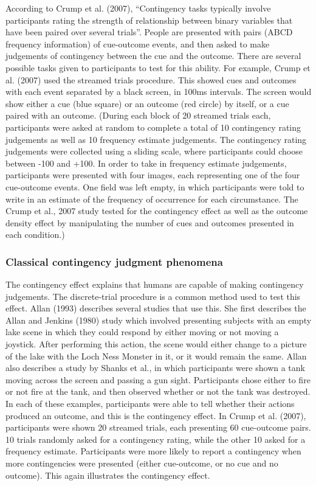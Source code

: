 \documentclass[
  english,
  man,floatsintext]{apa6}
\begin{document}
According to Crump et al. (2007), \enquote{Contingency tasks typically involve participants rating the strength of relationship between binary variables that have been paired over several trials}. People are presented with pairs (ABCD frequency information) of cue-outcome events, and then asked to make judgements of contingency between the cue and the outcome. There are several possible tasks given to participants to test for this ability. For example, Crump et al. (2007) used the streamed trials procedure. This showed cues and outcomes with each event separated by a black screen, in 100ms intervals. The screen would show either a cue (blue square) or an outcome (red circle) by itself, or a cue paired with an outcome. (During each block of 20 streamed trials each, participants were asked at random to complete a total of 10 contingency rating judgements as well as 10 frequency estimate judgements. The contingency rating judgements were collected using a sliding scale, where participants could choose between -100 and +100. In order to take in frequency estimate judgements, participants were presented with four images, each representing one of the four cue-outcome events. One field was left empty, in which participants were told to write in an estimate of the frequency of occurrence for each circumstance. The Crump et al., 2007 study tested for the contingency effect as well as the outcome density effect by manipulating the number of cues and outcomes presented in each condition.)

\hypertarget{classical-contingency-judgment-phenomena}{%
\subsubsection{Classical contingency judgment phenomena}\label{classical-contingency-judgment-phenomena}}

The contingency effect explains that humans are capable of making contingency judgements. The discrete-trial procedure is a common method used to test this effect. Allan (1993) describes several studies that use this. She first describes the Allan and Jenkins (1980) study which involved presenting subjects with an empty lake scene in which they could respond by either moving or not moving a joystick. After performing this action, the scene would either change to a picture of the lake with the Loch Ness Monster in it, or it would remain the same. Allan also describes a study by Shanks et al., in which participants were shown a tank moving across the screen and passing a gun sight. Participants chose either to fire or not fire at the tank, and then observed whether or not the tank was destroyed. In each of these examples, participants were able to tell whether their actions produced an outcome, and this is the contingency effect. In Crump et al. (2007), participants were shown 20 streamed trials, each presenting 60 cue-outcome pairs. 10 trials randomly asked for a contingency rating, while the other 10 asked for a frequency estimate. Participants were more likely to report a contingency when more contingencies were presented (either cue-outcome, or no cue and no outcome). This again illustrates the contingency effect.
\end{document}
